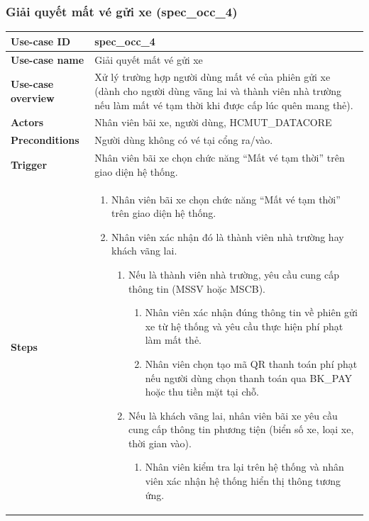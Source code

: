 \subsubsection{Giải quyết mất vé gửi xe (spec\_occ\_4)}
\begingroup
\small
\begin{longtable}{|>{\centering\arraybackslash}m{3cm}|m{13.7cm}|}
\hline
\textbf{Use-case ID} & spec\_occ\_4   \\ \hline
\textbf{Use-case name} & Giải quyết mất vé gửi xe   \\ \hline
\textbf{Use-case overview} & Xử lý trường hợp người dùng mất vé của phiên gửi xe (dành cho người dùng vãng lai và thành viên nhà trường nếu làm mất vé tạm thời khi được cấp lúc quên mang thẻ). \\ \hline
\textbf{Actors} & Nhân viên bãi xe, người dùng, HCMUT\_DATACORE   \\ \hline
\textbf{Preconditions} & Người dùng không có vé tại cổng ra/vào. \\ \hline
\textbf{Trigger} & Nhân viên bãi xe chọn chức năng “Mất vé tạm thời” trên giao diện hệ thống. \\ \hline
\textbf{Steps} & 
\begin{enumerate}[label=\arabic*., leftmargin=1.5em, nosep]
    \item Nhân viên bãi xe chọn chức năng “Mất vé tạm thời” trên giao diện hệ thống.
    \item Nhân viên xác nhận đó là thành viên nhà trường hay khách vãng lai.
    \begin{enumerate}[label=2.\arabic*., leftmargin=2em, nosep]
        \item Nếu là thành viên nhà trường, yêu cầu cung cấp thông tin (MSSV hoặc MSCB).
        \begin{enumerate}[label=2.1.\arabic*., leftmargin=2.5em, nosep]
            \item Nhân viên xác nhận đúng thông tin về phiên gửi xe từ hệ thống và yêu cầu thực hiện phí phạt làm mất thẻ.
            \item Nhân viên chọn tạo mã QR thanh toán phí phạt nếu người dùng chọn thanh toán qua BK\_PAY hoặc thu tiền mặt tại chỗ.
        \end{enumerate}
        \item Nếu là khách vãng lai, nhân viên bãi xe yêu cầu cung cấp thông tin phương tiện (biển số xe, loại xe, thời gian vào).
        \begin{enumerate}[label=2.2.\arabic*., leftmargin=2.5em, nosep]
            \item Nhân viên kiểm tra lại trên hệ thống và nhân viên xác nhận hệ thống hiển thị thông tương ứng.

\end{enumerate}
\end{enumerate}
\end{enumerate}
\end{longtable}
